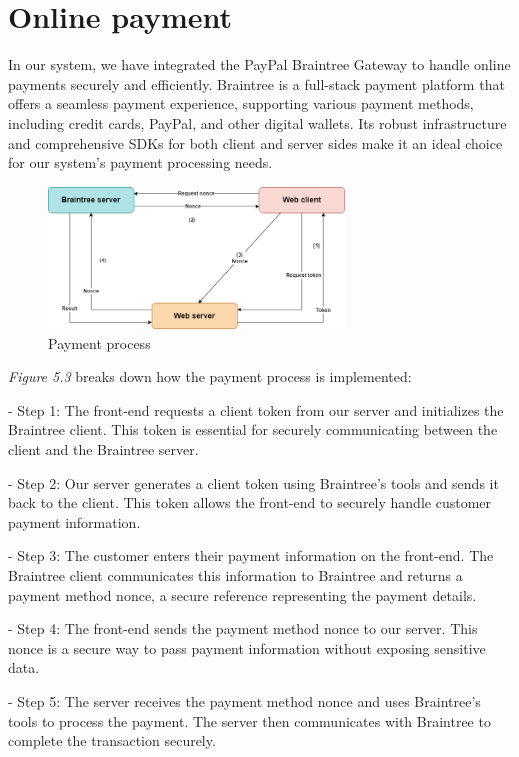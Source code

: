 \section{Online payment}

In our system, we have integrated the PayPal Braintree Gateway to handle online payments securely and efficiently. Braintree is a full-stack payment platform that offers a seamless payment experience, supporting various payment methods, including credit cards, PayPal, and other digital wallets. Its robust infrastructure and comprehensive SDKs for both client and server sides make it an ideal choice for our system's payment processing needs.

\begin{figure}[H]
    \centering
    \includegraphics[width=0.7\textwidth]{Figures/payment-strat.png}
    \caption{Payment process}
\end{figure}

\emph{Figure 5.3} breaks down how the payment process is implemented:

- Step 1:
The front-end requests a client token from our server and initializes the Braintree client. This token is essential for securely communicating between the client and the Braintree server.

- Step 2:
Our server generates a client token using Braintree's tools and sends it back to the client. This token allows the front-end to securely handle customer payment information.

- Step 3:
The customer enters their payment information on the front-end. The Braintree client communicates this information to Braintree and returns a payment method nonce, a secure reference representing the payment details.

- Step 4:
The front-end sends the payment method nonce to our server. This nonce is a secure way to pass payment information without exposing sensitive data.

- Step 5:
The server receives the payment method nonce and uses Braintree's tools to process the payment. The server then communicates with Braintree to complete the transaction securely.

